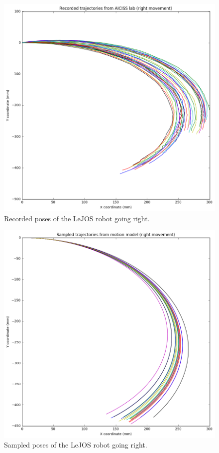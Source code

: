 \documentclass[paper=a4, fontsize=11pt]{scrartcl} %
\begin{document}
    \begin{figure}[h!]
        \begin{center}
            \setlength{\fboxsep}{0.5pt} %
            \setlength{\fboxrule}{0.5pt}
            \includegraphics[width=0.65\linewidth,fbox]{images/recorded_poses_right.png}
            \caption{Recorded poses of the LeJOS robot going right.}
        \end{center}
    \end{figure}

    \begin{figure}[h!]
        \begin{center}
            \setlength{\fboxsep}{0.5pt} %
            \setlength{\fboxrule}{0.5pt}
            \includegraphics[width=0.65\linewidth,fbox]{images/sampled_poses_right.png}
            \caption{Sampled poses of the LeJOS robot going right.}
        \end{center}
    \end{figure}
\end{document}
